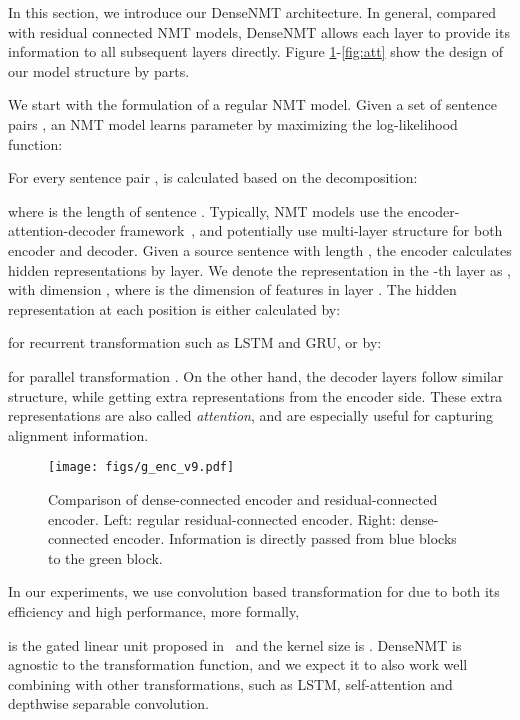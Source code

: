 \documentclass[11pt,a4paper]{article}
\begin{document}
In this section, we introduce our DenseNMT architecture. 
In general, compared with residual connected NMT models, DenseNMT allows each layer to provide its information to all subsequent layers directly. 
Figure \ref{fig:enc}-\ref{fig:att} show the design of our model structure by parts. 



We start with the formulation of a regular NMT model. 
Given a set of sentence pairs , an NMT model learns parameter  by maximizing the log-likelihood function:

For every sentence pair ,   is calculated based on the decomposition:

where  is the length of sentence . Typically, NMT models use the encoder-attention-decoder framework~\cite{bahdanau2014neural}, and potentially use multi-layer structure for both encoder and decoder. Given a source sentence  with length , the encoder calculates hidden representations by layer.
We denote the representation in the -th layer as , with dimension , where  is the dimension of features in layer . 
The hidden representation at each position  is either calculated by:

for recurrent transformation  such as LSTM and GRU, or by:

for parallel transformation . 
On the other hand, the decoder layers  follow similar structure, while getting extra representations from the encoder side. 
These extra representations are also called \textit{attention}, and are especially useful for capturing alignment information.


\begin{figure}[t]
\centering 
\small 
\captionsetup{font=small}
\texttt{[image: figs/g\_enc\_v9.pdf]}
\caption{Comparison of dense-connected encoder and residual-connected encoder. Left: regular residual-connected encoder. Right: dense-connected encoder. Information is directly passed from blue blocks to the green block.}
\label{fig:enc}
\end{figure}


In our experiments, we use convolution based transformation for  due to both its efficiency and high performance, more formally,

 is the gated linear unit proposed in~\cite{dauphin2016language} and the kernel size is . 
DenseNMT is agnostic to the transformation function, and we expect it to also work well combining with other transformations, such as LSTM, self-attention and depthwise separable convolution. 
\end{document}
